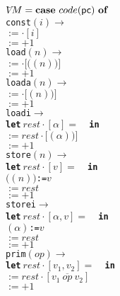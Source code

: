 \documentclass[german,10pt, a4paper, twocolumn]{scrartcl}
\theoremstyle{definition}
\theoremstyle{remark}
\begin{document}
\begin{tabbing}
 $V$\=$M = \mbox{\textbf{case}}\ code(\mbox{\sffamily pc})\ \mbox{\textbf{of}}$ \\
 \>	\tt{co}\=\tt{nst}$(i) \rightarrow$ \\
 \>	\>	$:=$$\cdotp [i]$\\
 \>	\>	$:=$$+1$\\
 \>	\tt{load}$(n)\rightarrow$\\
 \>	\>	$:=$$\cdotp [$$($$(n))]$\\
 \>	\>	$:=$$+1$\\
 \>	\tt{loada}$(n)\rightarrow$\\
 \>	\>	$:=$$\cdotp [$$(n))]$\\
 \>	\>	$:=$$+1$\\
 \>	\tt{loadi}$\rightarrow$\\
 \>	\>	\textbf{le}\=\textbf{t}$\ rest\cdotp[\alpha]=$ \ \textbf{in}\\
 \>	\>	\>	$:=rest\cdotp [$$(\alpha))]$\\
 \>	\>	\>	$:=$$+1$\\
 \>	\tt{store}$(n)\rightarrow$\\
 \>	\>	\textbf{let}$\ rest\cdotp[v]=$ \ \textbf{in}\\
 \>	\>	\>	$($$(n))$:=$v$\\
 \>	\>	\>	$:=rest$\\
 \>	\>	\>	$:=$$+1$\\
 \>	\tt{storei}$\rightarrow$\\
 \>	\>	\textbf{let}$\ rest\cdotp[\alpha,v]=$ \ \textbf{in}\\
 \>	\>	\>	$(\alpha)$:=$v$\\
 \>	\>	\>	$:=rest$\\
 \>	\>	\>	$:=$$+1$\\
 \>	\tt{prim}$(op)\rightarrow$\\
 \>	\>	\textbf{let}$\ rest\cdotp[v_1,v_2]=$ \ \textbf{in}\\
 \>	\>	\>	$:=rest\cdotp[v_1\ \overline{op}\ v_2]$\\
 \>	\>	\>	$:=$$+1$\\

\end{tabbing}
\end{document}
